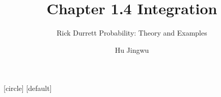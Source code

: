 [circle]
[default]

\usepackage{amsmath,amssymb,mathtools}

\newcommand{\OmegaSpace}{\Omega}
\newcommand{\F}{\mathcal{F}}
\newcommand{\B}{\mathcal{B}}
\newcommand{\R}{\mathbb{R}}
\newcommand{\N}{\mathbb{N}}
\newcommand{\Prob}{\mathbb{P}}
\newcommand{\E}{\mathbb{E}}
\newcommand{\one}{\mathbf{1}}
\newcommand{\eps}{\varepsilon}
\newcommand{\lam}{\lambda}
\newcommand{\vikiname}[1]{\par\smallskip{\scriptsize\color{blue!60!black}\textbf{LLMwiki:} \texttt{\detokenize{#1}}}}
\newcommand{\blankproof}{%
  \vspace{2mm}
  {\color{gray!55}\rule{\linewidth}{0.4pt}}\par\vspace{5mm}
  {\color{gray!55}\rule{\linewidth}{0.4pt}}\par\vspace{5mm}
  {\color{gray!55}\rule{\linewidth}{0.4pt}}\par\vspace{5mm}
  {\color{gray!55}\rule{\linewidth}{0.4pt}}\par
}
\newcommand{\longblankproof}{%
  \vspace{1mm}
  {\color{gray!55}\rule{\linewidth}{0.4pt}}\par\vspace{4mm}
  {\color{gray!55}\rule{\linewidth}{0.4pt}}\par\vspace{4mm}
  {\color{gray!55}\rule{\linewidth}{0.4pt}}\par\vspace{4mm}
  {\color{gray!55}\rule{\linewidth}{0.4pt}}\par\vspace{4mm}
  {\color{gray!55}\rule{\linewidth}{0.4pt}}\par\vspace{4mm}
  {\color{gray!55}\rule{\linewidth}{0.4pt}}\par
}
\newcommand{\proofblock}[1]{\ifteacher #1 \else \blankproof \fi}
\newcommand{\longproofblock}[1]{\ifteacher #1 \else \longblankproof \fi}

\title[Chapter 1.4]{Chapter 1.4 Integration}
\subtitle{Rick Durrett Probability: Theory and Examples}
\author{Hu Jingwu}
\date{}



